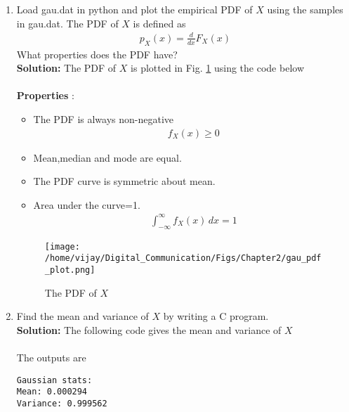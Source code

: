 \documentclass[journal,10pt,twocolumn]{IEEEtran}
\newcounter{Chapcounter}
\numberwithin{equation}{subsection}
\numberwithin{figure}{subsection}
\renewcommand\thesection{\theChapcounter.\arabic{section}}
\newcommand{\solution}{\noindent \textbf{Solution: }}
\renewcommand\thesection{\arabic{section}}
\renewcommand\thesubsection{\thesection.\arabic{subsection}}
\begin{document}
\begin{enumerate}[label=\thesubsection.\arabic*,ref=\thesubsection.\arabic{figure}]
\item
Load gau.dat in python and plot the empirical PDF of $X$ using the samples in gau.dat. The PDF of $X$ is defined as
\begin{align}
p_{X}(x) = \frac{d}{dx}F_{X}(x)
\label{eq:cdf_to_pdf}
\end{align}
What properties does the PDF have?
\\
\solution The PDF of $X$ is plotted in Fig. \ref{fig:gauss_pdf} using the code below\\

\\

\textbf{Properties} : 
\begin{itemize}
\item The PDF is always non-negative
\begin{align}
f_X(x) \ge 0
\end{align}
\item Mean,median and mode are equal.
\item The PDF curve is symmetric about mean.
\item Area under the curve=1.
\begin{align}
	\int_{-\infty}^{\infty} f_X(x) \,dx = 1
\end{align}
\end{itemize}

\begin{figure}[!ht]
\centering
\texttt{[image: /home/vijay/Digital\_Communication/Figs/Chapter2/gau\_pdf\_plot.png]}  
\caption{The PDF of $X$}
\label{fig:gauss_pdf}
\end{figure}

\item Find the mean and variance of $X$ by writing a C program.\\

\solution The following code gives the mean and variance of $X$\\

\\

The outputs are
\begin{lstlisting}
Gaussian stats:
Mean: 0.000294
Variance: 0.999562	
\end{lstlisting}


\end{enumerate}
\end{document}
